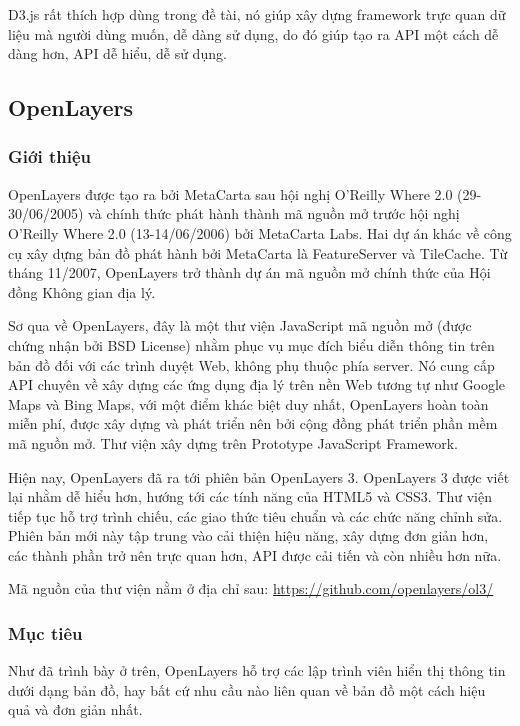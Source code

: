 \documentclass[12pt,a4paper,oneside]{article}
\begin{document}
D3.js rất thích hợp dùng trong đề tài, nó giúp xây dựng framework trực quan dữ liệu mà người dùng muốn, dễ dàng sử dụng, do đó giúp tạo ra API một cách dễ dàng hơn, API dễ hiểu, dễ sử dụng.

\subsection{OpenLayers}
\subsubsection{Giới thiệu}
OpenLayers\cite{ol} được tạo ra bởi MetaCarta sau hội nghị O'Reilly Where 2.0 (29-30/06/2005) và chính thức phát hành thành mã nguồn mở trước hội nghị  O'Reilly Where 2.0 (13-14/06/2006) bởi MetaCarta Labs. Hai dự án khác về công cụ xây dựng bản đồ phát hành bởi MetaCarta là FeatureServer và TileCache. Từ tháng 11/2007, OpenLayers trở thành dự án mã nguồn mở chính thức của Hội đồng Không gian địa lý.

Sơ qua về OpenLayers, đây là một thư viện JavaScript mã nguồn mở (được chứng nhận bởi BSD License) nhằm phục vụ mục đích biểu diễn thông tin trên bản đồ  đối với các trình duyệt Web, không phụ thuộc phía server. Nó cung cấp API chuyên về xây dựng các ứng dụng địa lý trên nền Web tương tự như Google Maps\cite{googlemap} và Bing Maps\cite{bingmap}, với một điểm khác biệt duy nhất, OpenLayers hoàn toàn miễn phí, được xây dựng và phát triển nên bởi cộng đồng phát triển phần mềm mã nguồn mở. Thư viện xây dựng trên Prototype JavaScript Framework\cite{prototypejs}.

Hiện nay, OpenLayers đã ra tới phiên bản OpenLayers 3\cite{ol3}. OpenLayers 3 được viết lại nhằm dễ hiểu hơn, hướng tới các tính năng của HTML5 và CSS3. Thư viện tiếp tục hỗ trợ trình chiếu, các giao thức tiêu chuẩn và các chức năng chỉnh sửa. Phiên bản mới này tập trung vào cải thiện hiệu năng, xây dựng đơn giản hơn, các thành phần trở nên trực quan hơn, API được cải tiến và còn nhiều hơn nữa.

Mã nguồn của thư viện nằm ở địa chỉ sau: \href{https://github.com/openlayers/ol3/}{https://github.com/openlayers/ol3/}

\subsubsection{Mục tiêu}
Như đã trình bày ở trên, OpenLayers hỗ trợ các lập trình viên hiển thị thông tin dưới dạng bản đồ, hay bất cứ nhu cầu nào liên quan về bản đồ một cách hiệu quả và đơn giản nhất.
\end{document}
